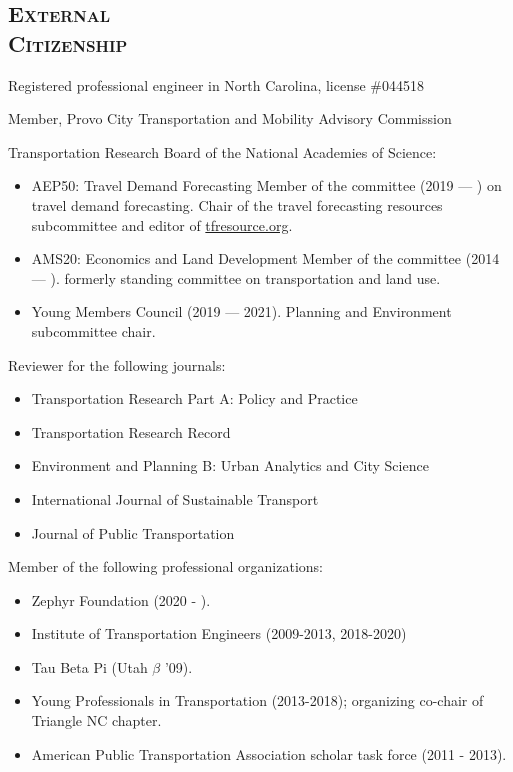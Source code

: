 \documentclass[margin,line]{res}
\newcommand{\secfont}{\scshape }
\begin{document}
\begin{resume}
\noindent\makebox[\linewidth]{\rule{\linewidth}{0.4pt}}
\section{\secfont External \\ Citizenship}

Registered professional engineer in North Carolina, license \#044518

Member, Provo City Transportation and Mobility Advisory Commission

Transportation Research Board of the National Academies of Science:

\begin{itemize}
  \item AEP50: Travel Demand Forecasting Member of the committee (2019 --- ) on
  travel demand forecasting. Chair of the travel forecasting resources
  subcommittee and editor of \url{tfresource.org}.
  \item AMS20: Economics and Land Development Member of the committee (2014
  --- ). formerly standing committee on transportation and land use.
  \item Young Members Council (2019 --- 2021). Planning and Environment subcommittee
  chair.
\end{itemize}


Reviewer for the following journals:

\begin{itemize}
  \item Transportation Research Part A: Policy and Practice
  \item Transportation Research Record
  \item Environment and Planning B: Urban Analytics and City Science
  \item International Journal of Sustainable Transport
  \item Journal of Public Transportation
\end{itemize}

Member of the following professional organizations:

\begin{itemize}
  \item Zephyr Foundation (2020 - ).
  \item Institute of Transportation Engineers (2009-2013, 2018-2020)
  \item Tau Beta Pi (Utah $\beta$ '09).
  \item Young Professionals in Transportation (2013-2018); organizing co-chair of
Triangle NC chapter.
  \item American Public Transportation Association scholar task force (2011 - 2013).
\end{itemize}


\end{resume}
\end{document}
